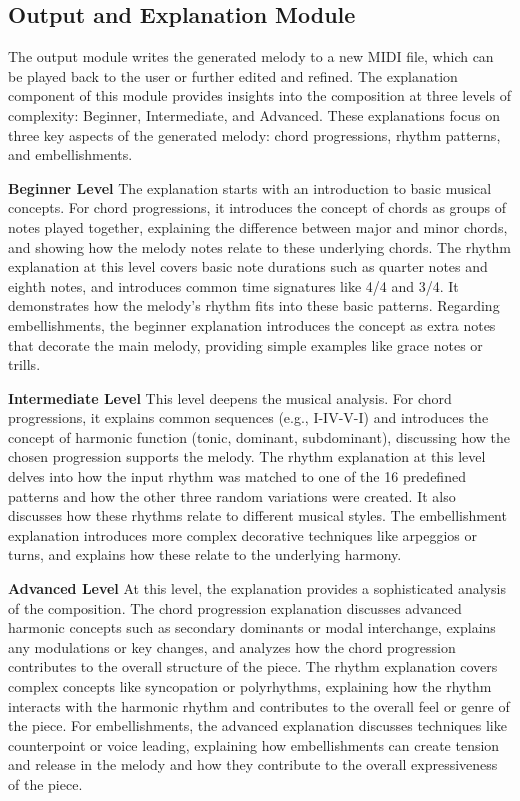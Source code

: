\subsection{Output and Explanation Module}

The output module writes the generated melody to a new MIDI file, which can be played back to the user or further edited and refined. The explanation component of this module provides insights into the composition at three levels of complexity: Beginner, Intermediate, and Advanced. These explanations focus on three key aspects of the generated melody: chord progressions, rhythm patterns, and embellishments.

\textbf{Beginner Level} The explanation starts with an introduction to basic musical concepts. For chord progressions, it introduces the concept of chords as groups of notes played together, explaining the difference between major and minor chords, and showing how the melody notes relate to these underlying chords. The rhythm explanation at this level covers basic note durations such as quarter notes and eighth notes, and introduces common time signatures like 4/4 and 3/4. It demonstrates how the melody's rhythm fits into these basic patterns. Regarding embellishments, the beginner explanation introduces the concept as extra notes that decorate the main melody, providing simple examples like grace notes or trills.

\textbf{Intermediate Level} This level deepens the musical analysis. For chord progressions, it explains common sequences (e.g., I-IV-V-I) and introduces the concept of harmonic function (tonic, dominant, subdominant), discussing how the chosen progression supports the melody. The rhythm explanation at this level delves into how the input rhythm was matched to one of the 16 predefined patterns and how the other three random variations were created. It also discusses how these rhythms relate to different musical styles. The embellishment explanation introduces more complex decorative techniques like arpeggios or turns, and explains how these relate to the underlying harmony.

\textbf{Advanced Level} At this level, the explanation provides a sophisticated analysis of the composition. The chord progression explanation discusses advanced harmonic concepts such as secondary dominants or modal interchange, explains any modulations or key changes, and analyzes how the chord progression contributes to the overall structure of the piece. The rhythm explanation covers complex concepts like syncopation or polyrhythms, explaining how the rhythm interacts with the harmonic rhythm and contributes to the overall feel or genre of the piece. For embellishments, the advanced explanation discusses techniques like counterpoint or voice leading, explaining how embellishments can create tension and release in the melody and how they contribute to the overall expressiveness of the piece.


